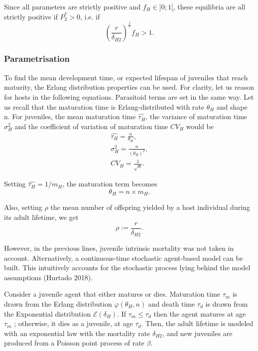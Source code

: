 \documentclass[12pt,a4paper,onecolumn]{article}
\begin{document}
Since all parameters are strictly positive and $f_H \in ]0;1[$, these equilibria are all strictly positive if $P_2^* > 0$, i.e. if
\begin{equation}
(\frac{r}{\delta_{H2}})^{\frac{1}{n}} f_H  > 1.
\end{equation}

\subsubsection{Parametrisation}
To find the mean development time, or expected lifespan of juveniles that reach maturity, the Erlang distribution properties can be used.
For clarity, let us reason for hosts in the following equations. Parasitoid terms are set in the same way.  Let us recall that the maturation time is Erlang-distributed with rate $\theta_H$ and shape n. For juveniles, the mean maturation time $\hat{\tau_{H}}$, the variance of maturation time $\sigma^2_{H}$ and the coefficient of variation of maturation time $CV_{H}$ would be 
\begin{align}
\hat{\tau_{H}} = \frac{n}{\theta_{H}}, \nonumber \\
\sigma^2_{H} = \frac{n}{(\theta_{H})^2}, \\
CV_{H} = \frac{1}{\sqrt{n}}. \nonumber 
\end{align}


Setting  $\hat{\tau_{H}} = 1/m_H$, the maturation term becomes
\begin{equation}
\theta_H = n \times m_H.
\end{equation}

Also, setting $\rho$ the mean number of offspring yielded by a host individual during its adult lifetime, we get 
\begin{equation}
\rho := \frac{r}{\delta_{H2}}.
\end{equation}

However, in the previous lines, juvenile intrinsic mortality was not taken in account. Alternatively, a continuous-time stochastic agent-based model can be built. This intuitively accounts for the stochastic process lying behind the model assumptions (Hurtado 2018).

Consider a juvenile agent that either matures or dies. Maturation time $\tau_m$ is drawn from the Erlang distribution $\varphi(\theta_H, n)$ and death time $\tau_d$ is drawn from the Exponential distribution $\mathcal{E}(\delta_H)$. If $\tau_m \leq \tau_d$ then the agent matures at age $\tau_m$ ; otherwise, it dies as a juvenile, at age $\tau_d$. Then, the adult lifetime is modeled with an exponential law with the mortality rate $\delta_{H2}$, and new juveniles are produced from a Poisson point process of rate $\beta$.
\end{document}
